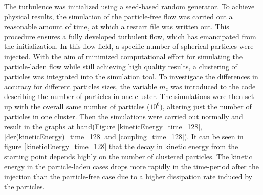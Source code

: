 \documentclass[11pt,a4paper,openany,oneside,parskip=half*]{article}
\begin{document}
The turbulence was initialized using a seed-based random generator. To achieve physical results, the simulation of the particle-free flow was carried out a reasonable amount of time, 
at which a restart file was written out. This procedure ensures a fully developed turbulent 
flow, which has emancipated from the initialization. In this flow field, a specific number of spherical particles were injected. 
\newline
With the aim of minimized computational effort for simulating the particle-laden flow while still achieving high quality results, a clustering of particles was integrated into the simulation tool. To investigate the differences in accuracy for different particles sizes, the variable $m_\mathrm{c}$ was introduced to the code describing the number of particles in one cluster. The simulations were then set up with the overall same number of particles ($ 10^6 $), altering just the number of particles in one cluster. Then the simulations were carried out normally and result in the graphs  at hand(Figure \ref{kineticEnergy_time_128}, \ref{der(kineticEnergy)_time_128} and \ref{coupling_time_128}). 
It can be seen in figure \ref{kineticEnergy_time_128} that the decay in kinetic energy from the starting point depends highly on the number of clustered particles. The kinetic energy in the particle-laden cases drops more rapidly in the time-period after the injection than the particle-free case due to a higher dissipation rate induced by the particles. 
\end{document}
